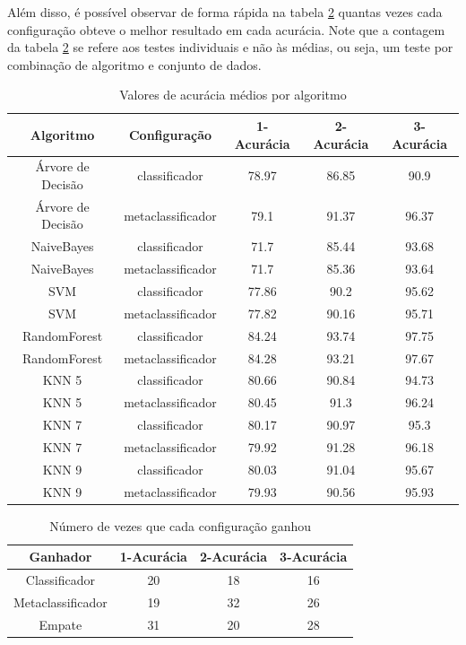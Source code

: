 Além disso, é possível observar de forma rápida na tabela \ref{tab:acuracias2} quantas vezes cada configuração obteve o melhor resultado em cada acurácia.
Note que a contagem da tabela \ref{tab:acuracias2} se refere aos testes individuais e não às médias, ou seja, um teste por combinação de algoritmo e conjunto de dados.


\begin{table}[h!]
  \begin{center}
    \resizebox{\textwidth}{!} {
    \begin{tabular}{ccccc}
      \hline
      \textbf{Algoritmo} & \textbf{Configuração} & \textbf{1-Acurácia} & \textbf{2-Acurácia} & \textbf{3-Acurácia}\\
      \hline

Árvore de Decisão	&	classificador	&	78.97	&	86.85	&	90.9	\\
Árvore de Decisão	&	metaclassificador	&	79.1	&	91.37	&	96.37	\\
NaiveBayes	&	classificador	&	71.7	&	85.44	&	93.68	\\
NaiveBayes	&	metaclassificador	&	71.7	&	85.36	&	93.64	\\
SVM	&	classificador	&	77.86	&	90.2	&	95.62	\\
SVM	&	metaclassificador	&	77.82	&	90.16	&	95.71	\\
RandomForest	&	classificador	&	84.24	&	93.74	&	97.75	\\
RandomForest	&	metaclassificador	&	84.28	&	93.21	&	97.67	\\
KNN 5	&	classificador	&	80.66	&	90.84	&	94.73	\\
KNN 5	&	metaclassificador	&	80.45	&	91.3	&	96.24	\\
KNN 7	&	classificador	&	80.17	&	90.97	&	95.3	\\
KNN 7	&	metaclassificador	&	79.92	&	91.28	&	96.18	\\
KNN 9	&	classificador	&	80.03	&	91.04	&	95.67	\\
KNN 9	&	metaclassificador	&	79.93	&	90.56	&	95.93	\\

      \hline
    \end{tabular}
    }
    \caption{Valores de acurácia médios por algoritmo}
    \label{tab:acuracias}
  \end{center}
\end{table}

\begin{table}[h!]
  \begin{center}
    \begin{tabular}{cccc}
      \hline
      \textbf{Ganhador} & \textbf{1-Acurácia} & \textbf{2-Acurácia} & \textbf{3-Acurácia}\\
      \hline

Classificador	&	20	&	18	&	16	\\
Metaclassificador	&	19	&	32	&	26	\\
Empate	&	31	&	20	&	28	\\

      \hline
    \end{tabular}
    \caption{Número de vezes que cada configuração ganhou}
    \label{tab:acuracias2}
  \end{center}
\end{table}

